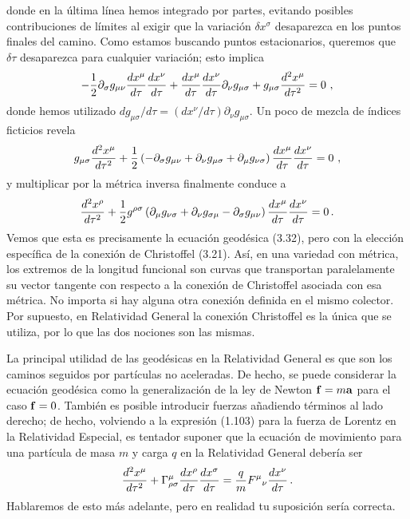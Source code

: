 \documentclass[11pt,b5paper,openany,twoside]{book}
\newcommand{\mn}{{\mu\nu}}
\newcommand{\p}[1]{{\partial_{#1}}}
\begin{document}
donde en la última línea hemos integrado por partes, evitando posibles contribuciones de límites al exigir que la variación $\delta x^\sigma$ desaparezca en los puntos finales del camino.
Como estamos buscando puntos estacionarios, queremos que $\delta \tau$ desaparezca para cualquier variación; esto implica
\begin{equation}
-{1\over 2}\p\sigma g_\mn {{dx^\mu}\over{d\tau}} {{dx^\nu}\over{d\tau}}
+ {{dx^\mu}\over{d\tau}} {{dx^\nu}\over{d\tau}} \p\nu g_{\mu\sigma}
+g_{\mu\sigma}{{d^2x^\mu}\over{d\tau^2}} = 0\ ,\label{3.54}
\end{equation}
donde hemos utilizado $d g_{\mu\sigma}/d\tau=(dx^\nu/d\tau)\p\nu g_{\mu\sigma}$.
Un poco de mezcla de índices ficticios revela
\begin{equation}
g_{\mu\sigma}{{d^2x^\mu}\over{d\tau^2}} +{1\over 2}\left(
-\p\sigma g_{\mn} + \p\nu g_{\mu\sigma} + \p\mu g_{\nu\sigma}
\right){{dx^\mu}\over{d\tau}} {{dx^\nu}\over{d\tau}} =0\ ,\label{3.55}
\end{equation}
y multiplicar por la métrica inversa finalmente conduce a
\begin{equation}
{{d^2x^\rho}\over{d\tau^2}} +{1\over 2}g^{\rho\sigma}\left(
\p\mu g_{\nu\sigma} + \p\nu g_{\sigma\mu}-\p\sigma g_{\mn}
\right){{dx^\mu}\over{d\tau}} {{dx^\nu}\over{d\tau}} =0\,.\label{3.56}
\end{equation}
Vemos que esta es precisamente la ecuación geodésica (3.32), pero con la elección específica de la conexión de Christoffel (3.21).
Así, en una variedad con métrica, los extremos de la longitud funcional son curvas que transportan paralelamente su vector tangente con respecto a la conexión de Christoffel asociada con esa métrica.
No importa si hay alguna otra conexión definida en el mismo colector.
Por supuesto, en Relatividad General la conexión Christoffel es la única que se utiliza, por lo que las dos nociones son las mismas.

La principal utilidad de las geodésicas en la Relatividad General es que son los caminos seguidos por partículas no aceleradas.
De hecho, se puede considerar la ecuación geodésica como la generalización de la ley de Newton ${\bf f}=m{\bf a}$ para el caso ${\bf f}=0$.
También es posible introducir fuerzas añadiendo términos al lado derecho; de hecho, volviendo a la expresión (1.103) para la fuerza de Lorentz en la Relatividad Especial, es tentador suponer que la ecuación de movimiento para una partícula de masa $m$ y carga $q$ en la Relatividad General debería ser
\begin{equation}
{{d^2x^\mu}\over{d\tau^2}}+\Gamma^\mu_{\rho\sigma}
{{dx^\rho}\over{d\tau}}{{dx^\sigma}\over{d\tau}}=
{q\over m}F^\mu{}_\nu{{dx^\nu}\over{d\tau}}\,.\label{3.57}
\end{equation}
Hablaremos de esto más adelante, pero en realidad tu suposición sería correcta.
\end{document}
